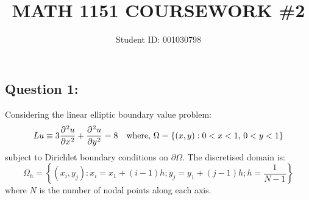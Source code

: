 \documentclass[fleqn]{article}
\begin{document}
\title{\vspace{-2\baselineskip} 
MATH 1151 COURSEWORK \#2
}
\author{Student ID: 001030798}


\maketitle
\subsection*{Question 1:}
Considering the linear elliptic boundary value problem:
\[Lu \equiv 3\diffp[2]{u}{x} + \diffp[2]{u}{y} = 8 \quad \text{where, }\Omega = \{(x,y): 0<x<1,\, 0<y<1\}
\]
subject to Dirichlet boundary conditions on $\partial\Omega$. The discretised domain is:
\[\Omega_h = \left\{ (x_i , y_j) : x_i = x_1+(i-1)h; y_j=y_1+(j-1)h; h = \frac{1}{N-1}\right\}\]
where $N$ is the number of nodal points along each axis.
\end{document}
